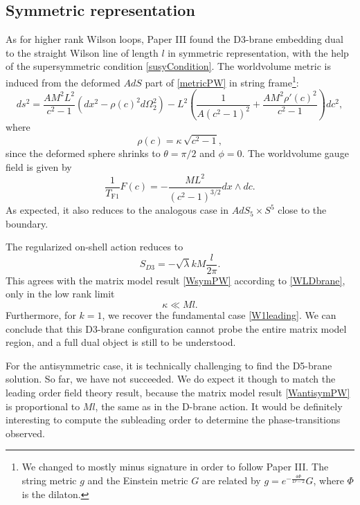 \subsection{Symmetric representation}
As for higher rank Wilson loops, Paper III found the D3-brane embedding dual to 
the straight Wilson line of length $l$ in symmetric representation, with the help of the supersymmetric condition \eqref{susyCondition}. 
The worldvolume metric is induced from the deformed $AdS$ part of \eqref{metricPW} in string frame\footnote{
We changed to mostly minus signature in order to follow Paper III.
The string metric $g$ and the Einstein metric $G$ are related by $g=e^{-\frac{4 \Phi }{D-2}} G$,
where $\Phi$ is the dilaton. 
}:
\begin{equation}
 ds^2 = \dfrac{A M^2 L^2}{c^2-1}\left(dx^2  - \rho(c)^2 d\Omega_2^2 \right)
	-L^2\left(\dfrac{1}{A \left(c^2-1\right)^2} + \dfrac{A M^2 \rho'(c)^2}{c^2-1} \right) dc^2,
\end{equation}
where 
\begin{equation}
 \rho(c)= \kappa \, \sqrt{c^2-1},
\end{equation}
since the deformed sphere shrinks to $\theta=\pi/2$ and $\phi=0$.
The worldvolume gauge field is given by
\begin{equation}
 \frac{1} {T_\text{F1}} F (c)  = -\dfrac{M L^2}{(c^2-1)^{3/2}} dx\wedge dc.
\end{equation}
As expected, it also reduces to the analogous case in $AdS_5 \times S^5$ close to the boundary. 

The regularized on-shell action reduces to
\begin{equation}
 S_{D3} = - \sqrt{\lambda} k M \dfrac{l}{2\pi}.
\end{equation}
This agrees with the matrix model result \eqref{WsymPW} according to \eqref{WLDbrane}, only in the low rank limit
\begin{equation}
 \kappa \ll M l.
\end{equation}
Furthermore, for $k=1$, we recover the fundamental case \eqref{W1leading}.
We can conclude that this D3-brane configuration cannot probe the entire matrix model region, 
and a full dual object is still to be understood.

For the antisymmetric case, it is technically challenging to find the D5-brane solution. 
So far, we have not succeeded.
We do expect it though to match the leading order field theory result, 
because the matrix model result \eqref{WantisymPW} is proportional to $Ml$, the same as in the D-brane action.
It would be definitely interesting to compute the subleading order to determine the phase-transitions observed. 


